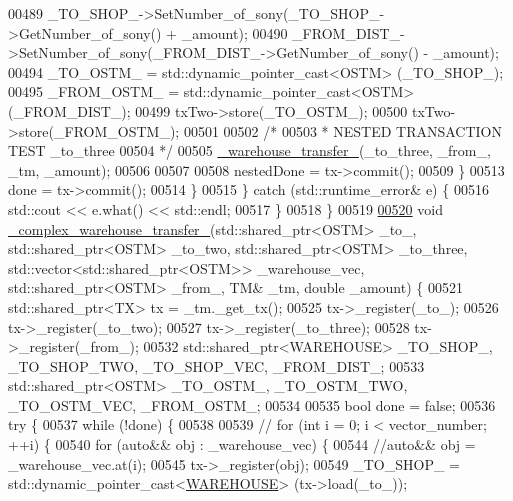 \begin{DoxyCode}
00489                 \_TO\_SHOP\_->SetNumber\_of\_sony(\_TO\_SHOP\_->GetNumber\_of\_sony() + \_amount);
00490                 \_FROM\_DIST\_->SetNumber\_of\_sony(\_FROM\_DIST\_->GetNumber\_of\_sony() - \_amount);
00494                 \_TO\_OSTM\_ = std::dynamic\_pointer\_cast<OSTM> (\_TO\_SHOP\_);
00495                 \_FROM\_OSTM\_ = std::dynamic\_pointer\_cast<OSTM> (\_FROM\_DIST\_);
00499                 txTwo->store(\_TO\_OSTM\_);
00500                 txTwo->store(\_FROM\_OSTM\_);
00501 
00502                 \textcolor{comment}{/*}
00503 \textcolor{comment}{                 * NESTED TRANSACTION TEST \_to\_three}
00504 \textcolor{comment}{                 */}
00505                 \hyperlink{main_8cpp_a1c170f18aac9dbb8aba1ad2f7e4619cc}{\_warehouse\_transfer\_}(\_to\_three, \_from\_, \_tm, \_amount);
00506 
00507 
00508                 nestedDone = tx->commit();
00509             \}
00513             done = tx->commit();
00514         \}
00515     \} \textcolor{keywordflow}{catch} (std::runtime\_error& e) \{
00516         std::cout << e.what() << std::endl;
00517     \}
00518 \}
00519 
\hypertarget{main_8cpp_source.tex_l00520}{}\hyperlink{main_8cpp_a12500f2bcc3c3bb8ad7dd9d74c1637d1}{00520} \textcolor{keywordtype}{void} \hyperlink{main_8cpp_a12500f2bcc3c3bb8ad7dd9d74c1637d1}{\_complex\_warehouse\_transfer\_}(std::shared\_ptr<OSTM> \_to\_, 
      std::shared\_ptr<OSTM> \_to\_two, std::shared\_ptr<OSTM> \_to\_three, std::vector<std::shared\_ptr<OSTM>> \_warehouse\_vec, 
      std::shared\_ptr<OSTM> \_from\_, TM& \_tm, \textcolor{keywordtype}{double} \_amount) \{
00521     std::shared\_ptr<TX> tx = \_tm.\_get\_tx();
00525     tx->\_register(\_to\_);
00526     tx->\_register(\_to\_two);
00527     tx->\_register(\_to\_three);
00528     tx->\_register(\_from\_);
00532     std::shared\_ptr<WAREHOUSE> \_TO\_SHOP\_, \_TO\_SHOP\_TWO, \_TO\_SHOP\_VEC, \_FROM\_DIST\_;
00533     std::shared\_ptr<OSTM> \_TO\_OSTM\_, \_TO\_OSTM\_TWO, \_TO\_OSTM\_VEC, \_FROM\_OSTM\_;
00534 
00535     \textcolor{keywordtype}{bool} done = \textcolor{keyword}{false};
00536     \textcolor{keywordflow}{try} \{
00537         \textcolor{keywordflow}{while} (!done) \{
00538 
00539             \textcolor{comment}{// for (int i = 0; i < vector\_number; ++i) \{}
00540             \textcolor{keywordflow}{for} (\textcolor{keyword}{auto}&& obj : \_warehouse\_vec) \{
00544                 \textcolor{comment}{//auto&& obj = \_warehouse\_vec.at(i);}
00545                 tx->\_register(obj);
00549                 \_TO\_SHOP\_ = std::dynamic\_pointer\_cast<\hyperlink{class_w_a_r_e_h_o_u_s_e}{WAREHOUSE}> (tx->load(\_to\_));

\end{DoxyCode}

